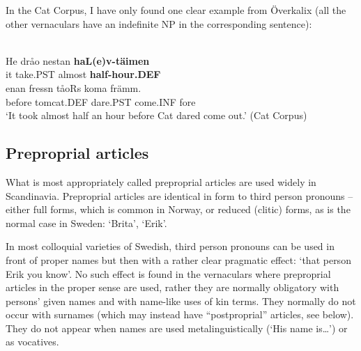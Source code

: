 \ea
	
	\z
\z 
	
In the Cat Corpus, I have only found one clear example from Överkalix (all the other vernaculars have an indefinite NP in the corresponding sentence):


\ea \label{} 
\\
\gll He  dråo  nestan  \textbf{haL(e)v-täimen}\\
it  take.PST  almost  \textbf{half-hour.DEF}\\
\gll enan  fressn  tåoRs  koma  främm.\\
before  tomcat.DEF  dare.PST  come.INF  fore\\
\glt ‘It took almost half an hour before Cat dared come out.’ (Cat Corpus)

\z

\subsection{ Preproprial articles}
\label{bkm:Ref224379496}

What is most appropriately called preproprial articles are used widely in Scandinavia. Preproprial articles are identical in form to third person pronouns – either full forms, which is common in Norway, or reduced (clitic) forms, as is the normal case in Sweden:  ‘Brita’, ‘Erik’. 

In most colloquial varieties of Swedish, third person pronouns can be used in front of proper names but then with a rather clear pragmatic effect:  ‘that person Erik you know’. No such effect is found in the vernaculars where preproprial articles in the proper sense are used, rather they are normally obligatory with persons’ given names and with name-like uses of kin terms. They normally do not occur with surnames (which may instead have “postproprial” articles, see below). They do not appear when names are used metalinguistically (‘His name is…’) or as vocatives. 

